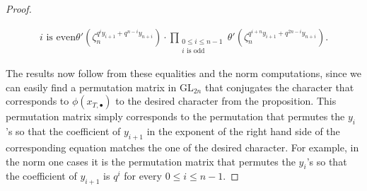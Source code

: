 \documentclass[12pt, reqno]{amsart}
\theoremstyle{definition}
\theoremstyle{definition}
\theoremstyle{definition}
\newcommand{\GL}{\mathrm{GL}}
\newcommand{\FieldNorm}[2]{\mathrm{N}_{#1:#2}}
\newcommand{\aFieldNorm}{\mathrm{N}}
\newcommand{\finiteField}{\mathbb{F}}
\newcommand{\finiteFieldExtension}[1]{\finiteField_{#1}}
\newcommand{\NormOneGroup}[1]{\finiteFieldExtension{#1}^{\aFieldNorm = 1}}
\newcommand{\algebraicGroup}[1]{\boldsymbol{\mathrm{#1}}}
\begin{document}
\begin{proof}
\begin{enumerate}
\begin{align*}
{{			i \text{ is even}}} \theta'\left(\zeta_n^{q^{i} y_{i+1} + q^{n-i} y_{n+i}}\right) \cdot \prod_{\substack{0 \le i \le n-1\\
		i \text{ is odd}}} \theta'\left(\zeta_n^{q^{i+n} y_{i+1} + q^{2n-i} y_{n+i}}\right).
	\end{align*}
\end{enumerate}
The results now follow from these equalities and the norm computations, since we can easily find a permutation matrix in $\GL_{2n}$ that conjugates the character that corresponds to $\phi\left(x_{T,\bullet}\right)$ to the desired character from the proposition. This permutation matrix simply corresponds to the permutation that permutes the $y_i$'s so that the coefficient of $y_{i+1}$ in the exponent of the right hand side of the corresponding equation matches the one of the desired character. For example, in the norm one cases it is the permutation matrix that permutes the $y_i$'s so that the coefficient of $y_{i+1}$ is $q^{i}$ for every $0 \le i \le n-1$.
\begin{comment}
Thus the result follows from the computations:
\begin{enumerate}
	\item[B,C,D Case 1] \begin{align*}
		\exp(\langle\phi(x_{\finiteFieldExtension{n},\alpha}),(y_1,y_2)\rangle) &= \exp(\langle x_{\finiteFieldExtension{n},\alpha},\phi^*(y_1,y_2)\rangle) \\
		&= \alpha\left(\FieldNorm{mn}{n}(y_1(\zeta_{mn})\right) \alpha\left(\FieldNorm{mn}{n}(y_2(\zeta_{mn})\right)^{-1} \\
		&= \left(\alpha\times\alpha^{-1}\right)\left(\FieldNorm{mn}{n}((y_1,y_2)(\zeta_{mn}))\right)
	\end{align*}
	\item \begin{align*}
		\exp(\langle\phi(x_{\NormOneGroup{2n},\theta}),(y_1,y_2)\rangle) &= \exp(\langle x_{\NormOneGroup{2n},\theta},\phi^*(y_1,y_2)\rangle) \\
		&= \theta\left(\frac{\FieldNorm{2mn}{2n}(y_1(\zeta_{2mn})}{\FieldNorm{2mn}{2n}\left(y_1(\zeta_{2mn})^{q^n}\right)}\right) \theta\left(\frac{\FieldNorm{2mn}{2n}(y_2(\zeta_{2mn})}{\FieldNorm{2mn}{2n}\left(y_2(\zeta_{2mn})^{q^n}\right)}\right)^{-1} \\
		&= \theta'\left(\FieldNorm{2mn}{2n}((y_1,y_2)(\zeta_{mn}))\right)
	\end{align*}
\end{enumerate}
\end{comment}
\end{proof}
\end{document}
